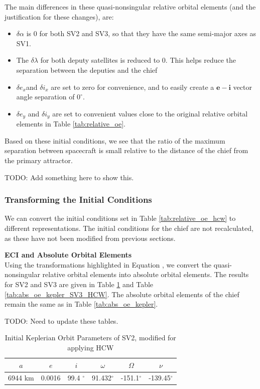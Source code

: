 The main differences in these quasi-nonsingular relative orbital elements (and the justification for these changes), are:
\begin{itemize}
    \item $\delta\alpha$ is 0 for both SV2 and SV3, so that they have the same semi-major axes as SV1.
    \item The $\delta\lambda$ for both deputy satellites is reduced to 0. This helps reduce the separation between the deputies and the chief
    \item $\delta e_x$and $\delta i_x$ are set to zero for convenience, and to easily create a $\boldsymbol{e}-\boldsymbol{i}$ vector angle separation of $0^\circ$.
    \item $\delta e_y$ and $\delta i_y$ are set to convenient values close to the original relative orbital elements in Table \ref{tab:relative_oe}.
\end{itemize}

Based on these initial conditions, we see that the ratio of the maximum separation between spacecraft is small relative to the distance of the chief from the primary attractor.

TODO: Add something here to show this.

\subsubsection{Transforming the Initial Conditions} \label{sec:hcw_initial_conditions}
We can convert the initial conditions set in Table \ref{tab:relative_oe_hcw} to different representations. The initial conditions for the chief are not recalculated, as these have not been modified from previous sections.

\textbf{ECI and Absolute Orbital Elements} \\
Using the transformations highlighted in Equation \label{eq:quasi_nonsign_roe}, 
we convert the quasi-nonsingular relative orbital elements into absolute orbital elements. The results for SV2 and SV3 are given in Table \ref{tab:abs_oe_kepler_SV2_HCW} and Table \ref{tab:abs_oe_kepler_SV3_HCW}. The absolute orbital elements of the chief remain the same as in Table \ref{tab:abs_oe_kepler}.

TODO: Need to update these tables.

\begin{table}[h]
\centering
\begin{tabular}{cccccc} \hline
    $a$ & $e$ & $i$ & $\omega$ & $\Omega$ & $\nu$ \\ \hline 
     6944 km & 0.0016 & 99.4 $^\circ$ & 91.432$^\circ$ & -151.1$^\circ$ & -139.45$^\circ$ \\ \hline
\end{tabular}
\caption{Initial Keplerian Orbit Parameters of SV2, modified for applying HCW}
\label{tab:abs_oe_kepler_SV2_HCW}
\end{table}

